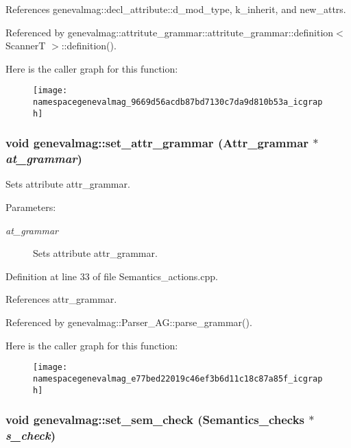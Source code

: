 References genevalmag::decl\_\-attribute::d\_\-mod\_\-type, k\_\-inherit, and new\_\-attrs.

Referenced by genevalmag::attritute\_\-grammar::attritute\_\-grammar::definition$<$ ScannerT $>$::definition().

Here is the caller graph for this function:\nopagebreak
\begin{figure}[H]
\begin{center}
\leavevmode
\texttt{[image: namespacegenevalmag\_9669d56acdb87bd7130c7da9d810b53a\_icgraph]}
\end{center}
\end{figure}
\hypertarget{namespacegenevalmag_e77bed22019c46ef3b6d11c18c87a85f}{
\subsubsection[{set\_\-attr\_\-grammar}]{\setlength{\rightskip}{0pt plus 5cm}void genevalmag::set\_\-attr\_\-grammar ({\bf Attr\_\-grammar} $\ast$ {\em at\_\-grammar})}}
\label{namespacegenevalmag_e77bed22019c46ef3b6d11c18c87a85f}


Sets attribute attr\_\-grammar. \begin{Desc}
\item[Parameters:]
\begin{description}
\item[{\em at\_\-grammar}]Sets attribute attr\_\-grammar. \end{description}
\end{Desc}


Definition at line 33 of file Semantics\_\-actions.cpp.

References attr\_\-grammar.

Referenced by genevalmag::Parser\_\-AG::parse\_\-grammar().

Here is the caller graph for this function:\nopagebreak
\begin{figure}[H]
\begin{center}
\leavevmode
\texttt{[image: namespacegenevalmag\_e77bed22019c46ef3b6d11c18c87a85f\_icgraph]}
\end{center}
\end{figure}
\hypertarget{namespacegenevalmag_b68c3ea3b4064fbd96451dd2a094ad34}{
\subsubsection[{set\_\-sem\_\-check}]{\setlength{\rightskip}{0pt plus 5cm}void genevalmag::set\_\-sem\_\-check ({\bf Semantics\_\-checks} $\ast$ {\em s\_\-check})}}
\label{namespacegenevalmag_b68c3ea3b4064fbd96451dd2a094ad34}


